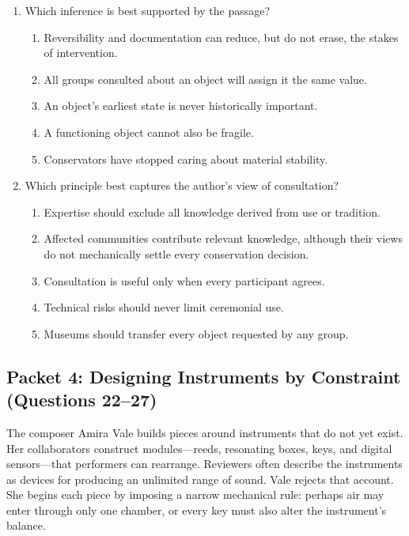 \begin{enumerate}
\item Which inference is best supported by the passage?
  \begin{enumerate}
  \item Reversibility and documentation can reduce, but do not erase, the stakes
        of intervention.
  \item All groups consulted about an object will assign it the same value.
  \item An object's earliest state is never historically important.
  \item A functioning object cannot also be fragile.
  \item Conservators have stopped caring about material stability.
  \end{enumerate}

\par\medskip

\item Which principle best captures the author's view of consultation?
  \begin{enumerate}
  \item Expertise should exclude all knowledge derived from use or tradition.
  \item Affected communities contribute relevant knowledge, although their views
        do not mechanically settle every conservation decision.
  \item Consultation is useful only when every participant agrees.
  \item Technical risks should never limit ceremonial use.
  \item Museums should transfer every object requested by any group.
  \end{enumerate}
\end{enumerate}

\subsection*{Packet 4: Designing Instruments by Constraint (Questions 22--27)}

The composer Amira Vale builds pieces around instruments that do not yet exist.
Her collaborators construct modules---reeds, resonating boxes, keys, and digital
sensors---that performers can rearrange. Reviewers often describe the instruments
as devices for producing an unlimited range of sound. Vale rejects that account.
She begins each piece by imposing a narrow mechanical rule: perhaps air may enter
through only one chamber, or every key must also alter the instrument's balance.

